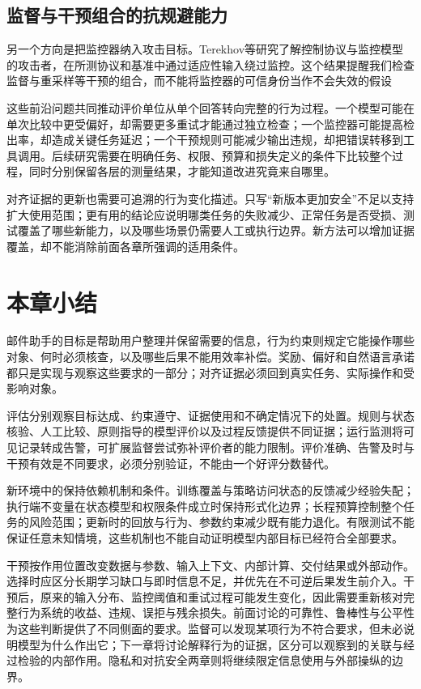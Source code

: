 \subsection{监督与干预组合的抗规避能力}

另一个方向是把监控器纳入攻击目标。Terekhov等研究了解控制协议与监控模型的攻击者，在所测协议和基准中通过适应性输入绕过监控。这个结果提醒我们检查监督与重采样等干预的组合，而不能将监控器的可信身份当作不会失效的假设

这些前沿问题共同推动评价单位从单个回答转向完整的行为过程。一个模型可能在单次比较中更受偏好，却需要更多重试才能通过独立检查；一个监控器可能提高检出率，却造成关键任务延迟；一个干预规则可能减少输出违规，却把错误转移到工具调用。后续研究需要在明确任务、权限、预算和损失定义的条件下比较整个过程，同时分别保留各层的测量结果，才能知道改进究竟来自哪里。

对齐证据的更新也需要可追溯的行为变化描述。只写“新版本更加安全”不足以支持扩大使用范围；更有用的结论应说明哪类任务的失败减少、正常任务是否受损、测试覆盖了哪些新能力，以及哪些场景仍需要人工或执行边界。新方法可以增加证据覆盖，却不能消除前面各章所强调的适用条件。

\section{本章小结}
\label{sec:alignment-summary}

邮件助手的目标是帮助用户整理并保留需要的信息，行为约束则规定它能操作哪些对象、何时必须核查，以及哪些后果不能用效率补偿。奖励、偏好和自然语言承诺都只是实现与观察这些要求的一部分；对齐证据必须回到真实任务、实际操作和受影响对象。

评估分别观察目标达成、约束遵守、证据使用和不确定情况下的处置。规则与状态核验、人工比较、原则指导的模型评价以及过程反馈提供不同证据；运行监测将可见记录转成告警，可扩展监督尝试弥补评价者的能力限制。评价准确、告警及时与干预有效是不同要求，必须分别验证，不能由一个好评分数替代。

新环境中的保持依赖机制和条件。训练覆盖与策略访问状态的反馈减少经验失配；执行端不变量在状态模型和权限条件成立时保持形式化边界；长程预算控制整个任务的风险范围；更新时的回放与行为、参数约束减少既有能力退化。有限测试不能保证任意未知情境，这些机制也不能自动证明模型内部目标已经符合全部要求。

干预按作用位置改变数据与参数、输入上下文、内部计算、交付结果或外部动作。选择时应区分长期学习缺口与即时信息不足，并优先在不可逆后果发生前介入。干预后，原来的输入分布、监控阈值和重试过程可能发生变化，因此需要重新核对完整行为系统的收益、违规、误拒与残余损失。前面讨论的可靠性、鲁棒性与公平性为这些判断提供了不同侧面的要求。监督可以发现某项行为不符合要求，但未必说明模型为什么作出它；下一章将讨论解释行为的证据，区分可以观察到的关联与经过检验的内部作用。隐私和对抗安全两章则将继续限定信息使用与外部操纵的边界。
